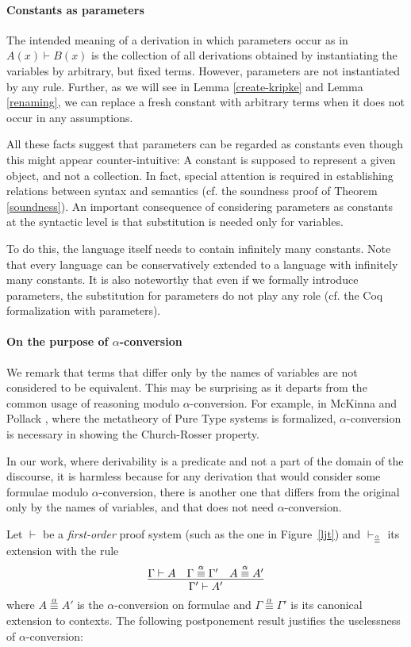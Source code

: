 \documentclass{svjour3}                     %
\newcommand{\seq}[2]{\infer{#2}{#1}}
\begin{document}
\paragraph{Constants as parameters}
The intended meaning of a derivation in which parameters occur as in $A(x) \vdash B(x)$ is the collection
of all derivations obtained by instantiating the variables by
arbitrary, but fixed terms. However, parameters
are not instantiated by any rule.
Further, as we will see in Lemma \ref{create-kripke} and Lemma \ref{renaming}, we can replace a fresh constant with arbitrary terms when it does not occur in any assumptions. 

All these facts suggest that parameters can be regarded as constants
even though this might appear counter-intuitive: A constant is supposed
to represent a given object, and not a collection. In fact, special
attention is required in establishing relations between syntax and
semantics (cf. the soundness proof of Theorem \ref{soundness}). An
important consequence of considering parameters as constants at the
syntactic level is that substitution is needed only for variables.  

To do this, the language itself needs to contain infinitely many
constants. Note that every language can be conservatively extended to a
language with infinitely many constants. 
It is also noteworthy that even if we formally introduce parameters, the
substitution for parameters do not play any role
(cf. the Coq formalization with parameters).


\paragraph{On the purpose of $\alpha$-conversion}
We remark that terms that differ only by the names of variables are not considered to be equivalent. This may be surprising as it departs from the common usage of reasoning modulo $\alpha$-conversion. For example, in McKinna and Pollack \cite{mcpol93,mcpol99}, where the metatheory of Pure Type systems is formalized, $\alpha$-conversion is necessary in showing the Church-Rosser property. 

In our work, where derivability is a predicate and not a part of the domain of the discourse, it is harmless because for any derivation that would consider some formulae modulo $\alpha$-conversion, there is another one that differs from the original only by the names of variables, and that does not need $\alpha$-conversion.

Let $\vdash$ be a {\em first-order} proof system (such as the one in
Figure~\ref{ljt}) and $\vdash_{\stackrel{\alpha}{\equiv}}$ its
extension with the rule
$$
\seq{\Gamma \vdash A \quad \Gamma \stackrel{\alpha}{\equiv} \Gamma'\quad
     A \stackrel{\alpha}{\equiv} A'}
    {\Gamma' \vdash A'}
$$ where $A \stackrel{\alpha}{\equiv} A'$ is the $\alpha$-conversion on
    formulae and $\Gamma \stackrel{\alpha}{\equiv} \Gamma'$ is its
    canonical extension to contexts. The following postponement result
    justifies the uselessness of $\alpha$-conversion:
\end{document}
